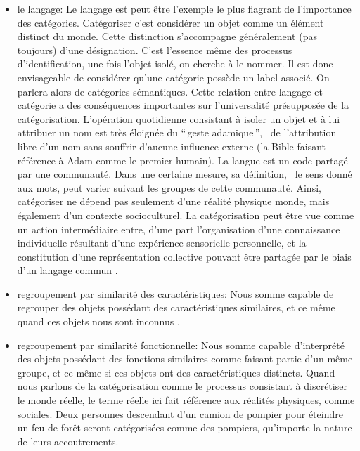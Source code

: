 \begin{itemize}
\item le langage: Le langage est peut être l'exemple le plus flagrant de l'importance des catégories. Catégoriser c'est considérer un objet comme un élément distinct du monde. Cette distinction s'accompagne généralement (pas toujours) d'une désignation. C'est l'essence même des processus d'identification, une fois l'objet isolé, on cherche à le nommer. Il est donc envisageable de considérer qu'une catégorie possède un label associé. On parlera alors de catégories sémantiques. Cette relation entre langage et catégorie a des conséquences importantes sur l'universalité présupposée de la catégorisation. L'opération quotidienne consistant à isoler un objet et à lui attribuer un nom est très éloignée du ``\,geste adamique\,'', \ie~de l'attribution libre d'un nom sans souffrir d'aucune influence externe (la Bible faisant référence à Adam comme le premier humain). La langue est un code partagé par une communauté. Dans une certaine mesure, sa définition, \ie~le sens donné aux mots, peut varier suivant les groupes de cette communauté. Ainsi, catégoriser ne dépend pas seulement d'une réalité physique monde, mais également d'un contexte socioculturel. La catégorisation peut être vue comme un action intermédiaire entre, d'une part l'organisation d'une connaissance individuelle résultant d'une expérience sensorielle personnelle, et la constitution d'une représentation collective pouvant être partagée par le biais d'un langage commun \citep{dubois2006cognitive}. 
\item regroupement par similarité des caractéristiques: Nous somme capable de regrouper des objets possédant des caractéristiques similaires, et ce même quand ces objets nous sont inconnus \citep{fried1984induction}.
\item regroupement par similarité fonctionnelle: Nous somme capable d'interprété des objets possédant des fonctions similaires comme faisant partie d'un même groupe, et ce même si ces objets ont des caractéristiques distincts. Quand nous parlons de la catégorisation comme le processus consistant à discrétiser le monde réelle, le terme réelle ici fait référence aux réalités physiques, comme sociales. Deux personnes descendant d'un camion de pompier pour éteindre un feu de forêt seront catégorisées comme des pompiers, qu'importe la nature de leurs accoutrements.
\end{itemize}



 \\

